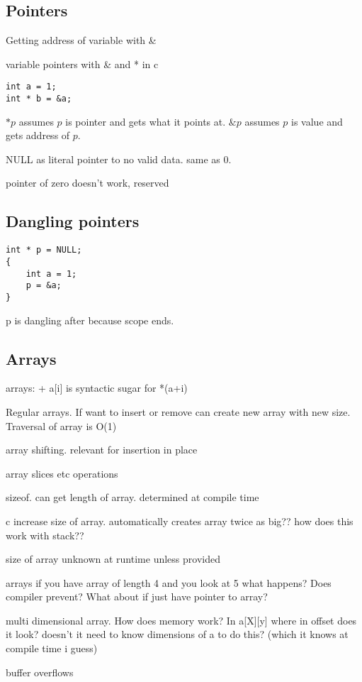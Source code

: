
\subsection{Pointers}
Getting address of variable with \&


variable pointers with \& and * in c

\begin{verbatim}
int a = 1;
int * b = &a;
\end{verbatim}
\(*p\) assumes \(p\) is pointer and gets what it points at. \(\&p\) assumes \(p\) is value and gets address of \(p\).


NULL as literal pointer to no valid data. same as \(0\).

pointer of zero doesn't work, reserved

\subsection{Dangling pointers}


\begin{verbatim}
int * p = NULL;
{
	int a = 1;
	p = &a;
}
\end{verbatim}

p is dangling after because scope ends.



\subsection{Arrays}


arrays:
+ a[i] is syntactic sugar for *(a+i)



Regular arrays. If want to insert or remove can create new array with new size.
Traversal of array is O(1)

array shifting. relevant for insertion in place


array slices etc operations


sizeof. can get length of array. determined at compile time

c increase size of array. automatically creates array twice as big?? how does this work with stack??

size of array unknown at runtime unless provided


arrays if you have array of length 4 and you look at 5 what happens? Does compiler prevent? What about if just have pointer to array?

multi dimensional array. How does memory work? In a[X][y] where in offset does it look? doesn't it need to know dimensions of a to do this? (which it knows at compile time i guess)


buffer overflows

